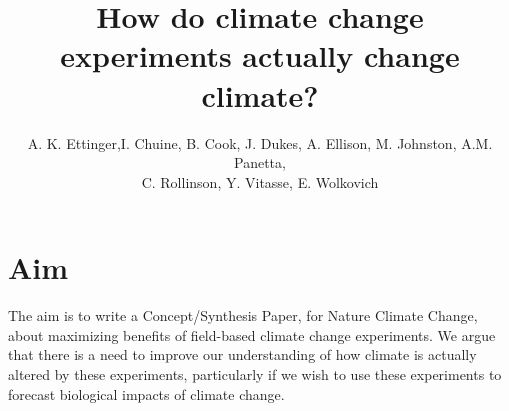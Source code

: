 \documentclass{article}
\begin{document}
 
\title{How do climate change experiments actually change climate?} %

\author{A. K. Ettinger,I. Chuine, B. Cook, J. Dukes, A. Ellison, M. Johnston, A.M. Panetta,\\ C. Rollinson, Y. Vitasse, E. Wolkovich}
\maketitle  %

\section* {Aim}

The aim is to write a Concept/Synthesis Paper, for Nature Climate Change, about maximizing benefits of field-based climate change experiments. We argue that there is a need to improve our understanding of how climate is actually altered by these experiments, particularly if we wish to use these experiments to forecast biological impacts of climate change. %
\end{document}
